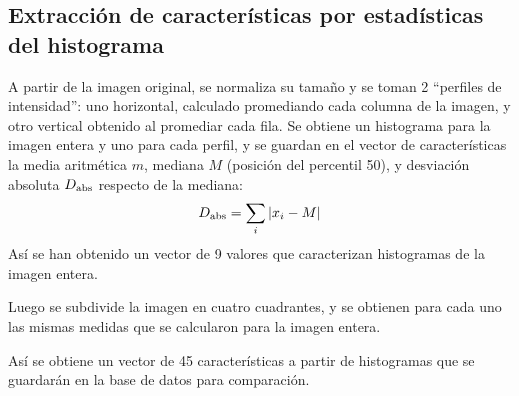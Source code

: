 \documentclass[conference,spanish,a4paper,10pt,oneside,final]{tfmpd}
\begin{document}
\subsection*{Extracción de características por estadísticas del histograma}
A partir de la imagen original, se normaliza su tamaño y se toman 2 ``perfiles
de intensidad'': uno horizontal, calculado promediando cada columna de la
imagen, y otro vertical obtenido al promediar cada fila. Se obtiene un
histograma para la imagen entera y uno para cada perfil, y se guardan en el
vector de características la media aritmética $m$, mediana $M$ (posición del
percentil 50),  y desviación absoluta $D_{\textrm{abs}}$ respecto de la mediana:
\begin{equation*}
D_{\textrm{abs}}=\sum_i |x_i - M|
\end{equation*}
Así se han obtenido un vector de 9 valores que caracterizan histogramas de la
imagen entera.

Luego se subdivide la imagen en cuatro cuadrantes, y se obtienen para cada uno
las mismas medidas que se calcularon para la imagen entera.

Así se obtiene un vector de 45 características a partir de histogramas que se
guardarán en la base de datos para comparación.
\end{document}
